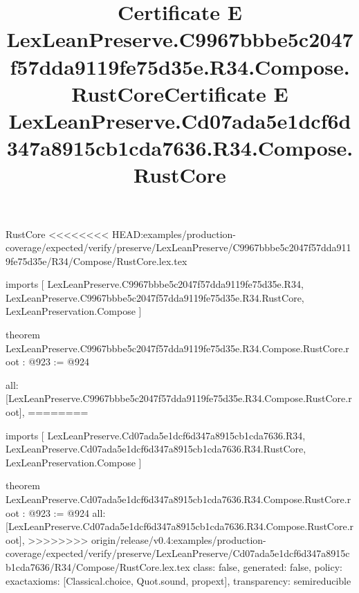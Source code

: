 \begin{lexlean}{RustCore}
<<<<<<<< HEAD:examples/production-coverage/expected/verify/preserve/LexLeanPreserve/C9967bbbe5c2047f57dda9119fe75d35e/R34/Compose/RustCore.lex.tex
\title{Certificate E LexLeanPreserve.C9967bbbe5c2047f57dda9119fe75d35e.R34.Compose.RustCore}
\begin{coremodule}
imports [
  LexLeanPreserve.C9967bbbe5c2047f57dda9119fe75d35e.R34,
  LexLeanPreserve.C9967bbbe5c2047f57dda9119fe75d35e.R34.RustCore,
  LexLeanPreservation.Compose
]

theorem LexLeanPreserve.C9967bbbe5c2047f57dda9119fe75d35e.R34.Compose.RustCore.root : @923 := @924 {
  all: [LexLeanPreserve.C9967bbbe5c2047f57dda9119fe75d35e.R34.Compose.RustCore.root],
========
\title{Certificate E LexLeanPreserve.Cd07ada5e1dcf6d347a8915cb1cda7636.R34.Compose.RustCore}
\begin{coremodule}
imports [
  LexLeanPreserve.Cd07ada5e1dcf6d347a8915cb1cda7636.R34,
  LexLeanPreserve.Cd07ada5e1dcf6d347a8915cb1cda7636.R34.RustCore,
  LexLeanPreservation.Compose
]

theorem LexLeanPreserve.Cd07ada5e1dcf6d347a8915cb1cda7636.R34.Compose.RustCore.root : @923 := @924 {
  all: [LexLeanPreserve.Cd07ada5e1dcf6d347a8915cb1cda7636.R34.Compose.RustCore.root],
>>>>>>>> origin/release/v0.4:examples/production-coverage/expected/verify/preserve/LexLeanPreserve/Cd07ada5e1dcf6d347a8915cb1cda7636/R34/Compose/RustCore.lex.tex
  class: false,
  generated: false,
  policy: exact{axioms: [Classical.choice, Quot.sound, propext]},
  transparency: semireducible
}


\end{coremodule}}
\end{coremodule}
\end{lexlean}
